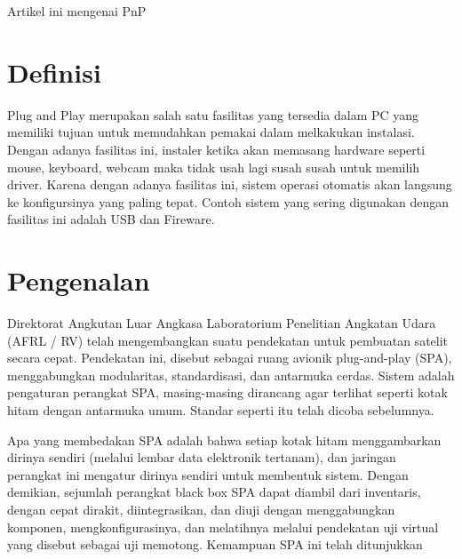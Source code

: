 
Artikel ini mengenai PnP

\section{Definisi}
Plug and Play merupakan salah satu fasilitas yang tersedia dalam PC yang memiliki tujuan untuk memudahkan pemakai dalam melkakukan instalasi. Dengan adanya fasilitas ini, instaler ketika akan memasang hardware seperti mouse, keyboard, webcam maka tidak usah lagi susah susah untuk memilih driver. Karena dengan adanya fasilitas ini, sistem operasi otomatis akan langsung ke konfigursinya yang paling tepat. Contoh sistem yang sering digunakan dengan fasilitas ini adalah USB dan Fireware. 
\section{Pengenalan}
Direktorat Angkutan Luar Angkasa Laboratorium Penelitian Angkatan Udara (AFRL / RV) telah mengembangkan suatu pendekatan untuk pembuatan satelit secara cepat. Pendekatan ini, disebut sebagai ruang avionik plug-and-play (SPA), menggabungkan modularitas, standardisasi, dan antarmuka cerdas. Sistem adalah pengaturan perangkat SPA, masing-masing dirancang agar terlihat seperti kotak hitam dengan antarmuka umum. Standar seperti itu telah dicoba sebelumnya.

Apa yang membedakan SPA adalah bahwa setiap kotak hitam menggambarkan dirinya sendiri (melalui lembar data elektronik tertanam), dan jaringan perangkat ini mengatur dirinya sendiri untuk membentuk sistem. Dengan demikian, sejumlah perangkat black box SPA dapat diambil dari inventaris, dengan cepat dirakit, diintegrasikan, dan diuji dengan menggabungkan komponen, mengkonfigurasinya, dan melatihnya melalui pendekatan uji virtual yang disebut sebagai uji memotong. Kemampuan SPA ini telah ditunjukkan